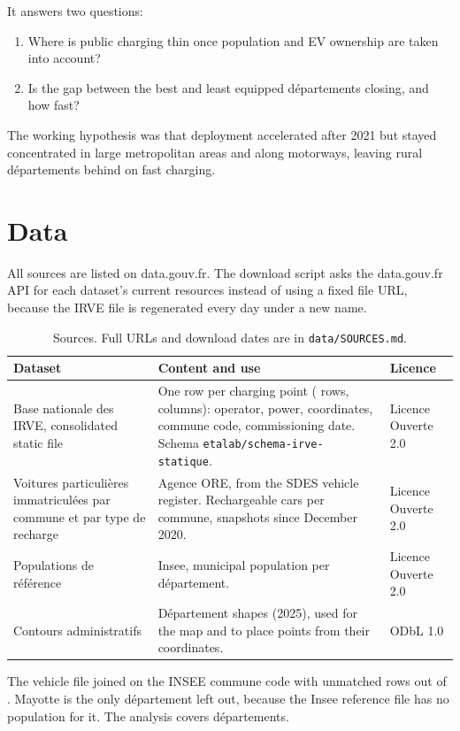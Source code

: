 \documentclass[11pt]{article}
\begin{document}
It answers two questions:
\begin{enumerate}
  \item Where is public charging thin once population and EV ownership are taken into account?
  \item Is the gap between the best and least equipped départements closing, and how fast?
\end{enumerate}

The working hypothesis was that deployment accelerated after 2021 but stayed concentrated in large metropolitan areas and along motorways, leaving rural départements behind on fast charging.

\section{Data}

All sources are listed on data.gouv.fr. The download script asks the data.gouv.fr API for each dataset's current resources instead of using a fixed file URL, because the IRVE file is regenerated every day under a new name.

\begin{table}[h]
\centering\small
\begin{tabularx}{\linewidth}{@{}p{4.6cm}Yp{2.6cm}@{}}
\toprule
\textbf{Dataset} & \textbf{Content and use} & \textbf{Licence} \\
\midrule
Base nationale des IRVE, consolidated static file & One row per charging point (\nRawRows{} rows, \nRawCols{} columns): operator, power, coordinates, commune code, commissioning date. Schema \texttt{etalab/schema-irve-statique}. & Licence Ouverte 2.0 \\
Voitures particulières immatriculées par commune et par type de recharge & Agence ORE, from the SDES vehicle register. Rechargeable cars per commune, \nEvQuarters{} snapshots since December 2020. & Licence Ouverte 2.0 \\
Populations de référence & Insee, municipal population \nPopYear{} per département. & Licence Ouverte 2.0 \\
Contours administratifs & Département shapes (2025), used for the map and to place points from their coordinates. & ODbL 1.0 \\
\bottomrule
\end{tabularx}
\caption{Sources. Full URLs and download dates are in \texttt{data/SOURCES.md}.}
\end{table}

The vehicle file joined on the INSEE commune code with \nEvNoDep{} unmatched rows out of \nEvRows. Mayotte is the only département left out, because the Insee \nPopYear{} reference file has no population for it. The analysis covers \nNDeps{} départements.
\end{document}
